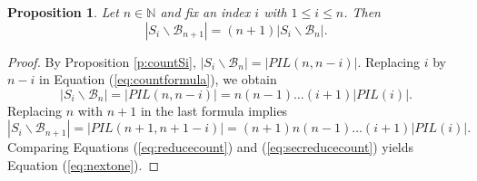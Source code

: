 \documentclass[12pt]{amsart}
\numberwithin{equation}{section}
\newtheorem{prop}[thm]{Proposition}
\theoremstyle{remark}
\newtheorem{rem}[thm]{Remark}
\theoremstyle{definition}
\newcommand{\B}{\mathcal{B}}
\newcommand{\F}{\mathcal{F}}
\begin{document}
\begin{prop}\label{p:nextone}
Let $n\in\mathbb{N}$ and fix an index $i$ with $1\leq i\leq n$.  Then 
\begin{equation}\label{eq:nextone}
|S_{i}\backslash\B_{n+1}|=(n+1) |S_{i}\backslash \B_{n}|.
\end{equation}
\end{prop}
\begin{proof}
By Proposition \ref{p:countSi}, $|S_{i}\backslash \B_{n}|=|PIL(n,n-i)|$.  Replacing 
$i$ by $n-i$ in Equation (\ref{eq:countformula}), we obtain 
\begin{equation}\label{eq:reducecount}
|S_{i}\backslash \B_{n}|=|PIL(n,n-i)|=n(n-1)\dots (i+1) |PIL(i)|.
\end{equation}
Replacing $n$ with $n+1$ in the last formula implies
\begin{equation}\label{eq:secreducecount}
|S_{i}\backslash\B_{n+1}|=|PIL(n+1,n+1-i)|=(n+1)n(n-1)\dots (i+1) |PIL(i)|.
\end{equation}
Comparing Equations (\ref{eq:reducecount}) and (\ref{eq:secreducecount}) yields 
Equation (\ref{eq:nextone}).



\end{proof}
\end{document}
